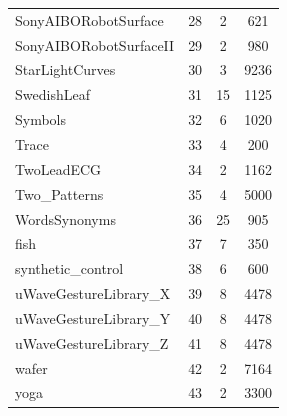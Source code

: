 \documentclass[twoside,11pt]{article}
\begin{document}
\begin{table} [h!]
\begin{center}
\begin{tabular}{lccc}
SonyAIBORobotSurface & 28 &  2 &  621 \\ 
SonyAIBORobotSurfaceII & 29 &  2 &  980 \\ 
StarLightCurves & 30 &  3 & 9236 \\ 
SwedishLeaf & 31 & 15 & 1125 \\ 
Symbols & 32 &  6 & 1020 \\ 
Trace & 33 &  4 &  200 \\ 
TwoLeadECG & 34 &  2 & 1162 \\ 
Two\_Patterns & 35 &  4 & 5000 \\ 
WordsSynonyms & 36 & 25 &  905 \\ 
fish & 37 &  7 &  350 \\ 
synthetic\_control & 38 &  6 &  600 \\ 
uWaveGestureLibrary\_X & 39 &  8 & 4478 \\ 
uWaveGestureLibrary\_Y & 40 &  8 & 4478 \\ 
uWaveGestureLibrary\_Z & 41 &  8 & 4478 \\ 
wafer & 42 &  2 & 7164 \\ 
yoga & 43 &  2 & 3300 \\ 
\end{tabular} 
\end{center} 
\end{table} 
 
\end{document}
